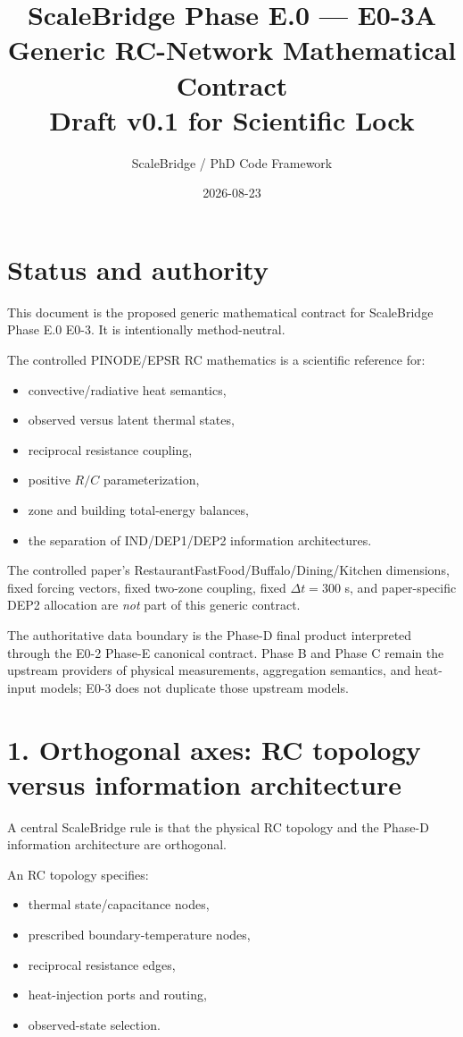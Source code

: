 \documentclass[11pt]{article}
\title{ScaleBridge Phase E.0 --- E0-3A\\
Generic RC-Network Mathematical Contract\\
\large Draft v0.1 for Scientific Lock}
\author{ScaleBridge / PhD Code Framework}
\date{2026-08-23}
\begin{document}
\maketitle

\section*{Status and authority}

This document is the proposed generic mathematical contract for ScaleBridge
Phase E.0 E0-3.  It is intentionally method-neutral.

The controlled PINODE/EPSR RC mathematics is a scientific reference for:
\begin{itemize}
    \item convective/radiative heat semantics,
    \item observed versus latent thermal states,
    \item reciprocal resistance coupling,
    \item positive $R/C$ parameterization,
    \item zone and building total-energy balances,
    \item the separation of IND/DEP1/DEP2 information architectures.
\end{itemize}

The controlled paper's RestaurantFastFood/Buffalo/Dining/Kitchen dimensions,
fixed forcing vectors, fixed two-zone coupling, fixed $\Delta t=300$ s, and
paper-specific DEP2 allocation are \emph{not} part of this generic contract.

The authoritative data boundary is the Phase-D final product interpreted
through the E0-2 Phase-E canonical contract.  Phase B and Phase C remain the
upstream providers of physical measurements, aggregation semantics, and
heat-input models; E0-3 does not duplicate those upstream models.

\section*{1. Orthogonal axes: RC topology versus information architecture}

A central ScaleBridge rule is that the physical RC topology and the
Phase-D information architecture are orthogonal.

An RC topology specifies:
\begin{itemize}
    \item thermal state/capacitance nodes,
    \item prescribed boundary-temperature nodes,
    \item reciprocal resistance edges,
    \item heat-injection ports and routing,
    \item observed-state selection.
\end{itemize}
\end{document}
